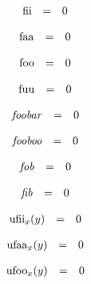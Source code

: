 \vspace{1ex}

$$
\begin{array}{@{}lcl@{}l@{}}
{\mathrm{fii}} &=& 0 \\
\end{array}
$$

$$
\begin{array}{@{}lcl@{}l@{}}
{\mathrm{faa}} &=& 0 \\
\end{array}
$$

$$
\begin{array}{@{}lcl@{}l@{}}
{\mathrm{foo}} &=& 0 \\
\end{array}
$$

$$
\begin{array}{@{}lcl@{}l@{}}
{\mathrm{fuu}} &=& 0 \\
\end{array}
$$

$$
\begin{array}{@{}lcl@{}l@{}}
{\mathit{foobar}} &=& 0 \\
\end{array}
$$

$$
\begin{array}{@{}lcl@{}l@{}}
{\mathit{fooboo}} &=& 0 \\
\end{array}
$$

$$
\begin{array}{@{}lcl@{}l@{}}
{\mathit{fob}} &=& 0 \\
\end{array}
$$

$$
\begin{array}{@{}lcl@{}l@{}}
{\mathit{fib}} &=& 0 \\
\end{array}
$$

$$
\begin{array}{@{}lcl@{}l@{}}
{{\mathrm{ufii}}}_{x}(y) &=& 0 \\
\end{array}
$$

$$
\begin{array}{@{}lcl@{}l@{}}
{{\mathrm{ufaa}}}_{x}(y) &=& 0 \\
\end{array}
$$

$$
\begin{array}{@{}lcl@{}l@{}}
{{\mathrm{ufoo}}}_{x}(y) &=& 0 \\
\end{array}
$$

